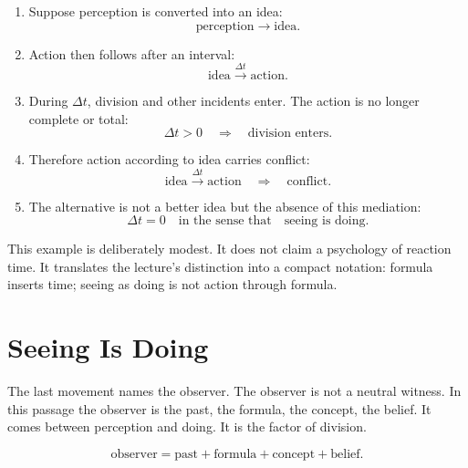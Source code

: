 \begin{enumerate}
\item Suppose perception is converted into an idea:
\begin{equation}
\text{perception} \longrightarrow \text{idea}.
\end{equation}

\item Action then follows after an interval:
\begin{equation}
\text{idea} \xrightarrow{\Delta t} \text{action}.
\end{equation}

\item During \(\Delta t\), division and other incidents enter. The action is no longer complete or total:
\begin{equation}
\Delta t > 0
\quad\Rightarrow\quad
\text{division enters}.
\end{equation}

\item Therefore action according to idea carries conflict:
\begin{equation}
\text{idea} \xrightarrow{\Delta t} \text{action}
\quad\Rightarrow\quad
\text{conflict}.
\end{equation}

\item The alternative is not a better idea but the absence of this mediation:
\begin{equation}
\Delta t = 0
\quad\text{in the sense that}\quad
\text{seeing is doing}.
\end{equation}
\end{enumerate}

This example is deliberately modest. It does not claim a psychology of reaction time. It translates the lecture's distinction into a compact notation: formula inserts time; seeing as doing is not action through formula.

\section{Seeing Is Doing}

The last movement names the observer. The observer is not a neutral witness. In this passage the observer is the past, the formula, the concept, the belief. It comes between perception and doing. It is the factor of division.

\begin{equation}
\text{observer}
=
\text{past}
+
\text{formula}
+
\text{concept}
+
\text{belief}.
\end{equation}

